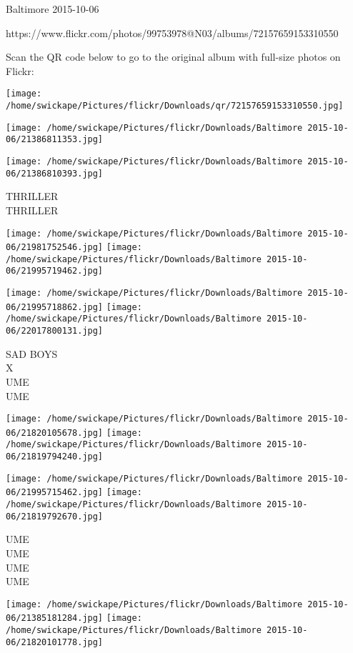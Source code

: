 \documentclass[10pt,letterpaper]{article}
\begin{document}
Baltimore 2015-10-06

https://www.flickr.com/photos/99753978@N03/albums/72157659153310550

Scan the QR code below to go to the original album with full-size photos on Flickr:

\texttt{[image: /home/swickape/Pictures/flickr/Downloads/qr/72157659153310550.jpg]}
\pagebreak

\texttt{[image: /home/swickape/Pictures/flickr/Downloads/Baltimore 2015-10-06/21386811353.jpg]}

\vspace{0.25in}
\texttt{[image: /home/swickape/Pictures/flickr/Downloads/Baltimore 2015-10-06/21386810393.jpg]}

THRILLER\\
THRILLER
\pagebreak

\texttt{[image: /home/swickape/Pictures/flickr/Downloads/Baltimore 2015-10-06/21981752546.jpg]}
\texttt{[image: /home/swickape/Pictures/flickr/Downloads/Baltimore 2015-10-06/21995719462.jpg]}

\texttt{[image: /home/swickape/Pictures/flickr/Downloads/Baltimore 2015-10-06/21995718862.jpg]}
\texttt{[image: /home/swickape/Pictures/flickr/Downloads/Baltimore 2015-10-06/22017800131.jpg]}

SAD BOYS\\
X\\
UME\\
UME
\pagebreak

\texttt{[image: /home/swickape/Pictures/flickr/Downloads/Baltimore 2015-10-06/21820105678.jpg]}
\texttt{[image: /home/swickape/Pictures/flickr/Downloads/Baltimore 2015-10-06/21819794240.jpg]}

\texttt{[image: /home/swickape/Pictures/flickr/Downloads/Baltimore 2015-10-06/21995715462.jpg]}
\texttt{[image: /home/swickape/Pictures/flickr/Downloads/Baltimore 2015-10-06/21819792670.jpg]}

UME\\
UME\\
UME\\
UME
\pagebreak

\texttt{[image: /home/swickape/Pictures/flickr/Downloads/Baltimore 2015-10-06/21385181284.jpg]}
\texttt{[image: /home/swickape/Pictures/flickr/Downloads/Baltimore 2015-10-06/21820101778.jpg]}
\end{document}
